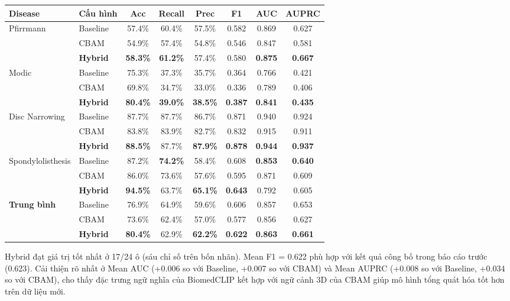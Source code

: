 \documentclass[11pt,a4paper]{article}
\newcommand{\best}[1]{\textcolor{best}{\textbf{#1}}}
\begin{document}
\noindent\small
\begin{tabular}{@{}llcccccc@{}}
\toprule
\rowcolor{tablehdr}
\textbf{Disease} & \textbf{Cấu hình} & Acc & Recall & Prec & F1 & AUC & AUPRC \\
\midrule
\multirow{3}{*}{Pfirrmann}
& Baseline & 57.4\% & 60.4\% & 57.5\% & 0.582 & 0.869 & 0.627 \\
& CBAM & 54.9\% & 57.4\% & 54.8\% & 0.546 & 0.847 & 0.581 \\
& \best{Hybrid} & \best{58.3\%} & \best{61.2\%} & 57.4\% & 0.580 & \best{0.875} & \best{0.667} \\
\midrule
\multirow{3}{*}{Modic}
& Baseline & 75.3\% & 37.3\% & 35.7\% & 0.364 & 0.766 & 0.421 \\
& CBAM & 69.8\% & 34.7\% & 33.0\% & 0.336 & 0.789 & 0.406 \\
& \best{Hybrid} & \best{80.4\%} & \best{39.0\%} & \best{38.5\%} & \best{0.387} & \best{0.841} & \best{0.435} \\
\midrule
\multirow{3}{*}{Disc Narrowing}
& Baseline & 87.7\% & 87.7\% & 86.7\% & 0.871 & 0.940 & 0.924 \\
& CBAM & 83.8\% & 83.9\% & 82.7\% & 0.832 & 0.915 & 0.911 \\
& \best{Hybrid} & \best{88.5\%} & 87.7\% & \best{87.9\%} & \best{0.878} & \best{0.944} & \best{0.937} \\
\midrule
\multirow{3}{*}{Spondylolisthesis}
& Baseline & 87.2\% & \best{74.2\%} & 58.4\% & 0.608 & \best{0.853} & \best{0.640} \\
& CBAM & 86.0\% & 73.6\% & 57.6\% & 0.595 & 0.871 & 0.609 \\
& \best{Hybrid} & \best{94.5\%} & 63.7\% & \best{65.1\%} & \best{0.643} & 0.792 & 0.605 \\
\midrule
\multirow{3}{*}{\textbf{Trung bình}}
& Baseline & 76.9\% & 64.9\% & 59.6\% & 0.606 & 0.857 & 0.653 \\
& CBAM & 73.6\% & 62.4\% & 57.0\% & 0.577 & 0.856 & 0.627 \\
& \best{Hybrid} & \best{80.4\%} & 62.9\% & \best{62.2\%} & \best{0.622} & \best{0.863} & \best{0.661} \\
\bottomrule
\end{tabular}
\normalsize

\vspace{0.5em}
\noindent Hybrid đạt giá trị tốt nhất ở 17/24 ô (sáu chỉ số trên bốn nhãn). Mean F1 = 0.622 phù hợp với kết quả công bố trong báo cáo trước (0.623). Cải thiện rõ nhất ở Mean AUC (+0.006 so với Baseline, +0.007 so với CBAM) và Mean AUPRC (+0.008 so với Baseline, +0.034 so với CBAM), cho thấy đặc trưng ngữ nghĩa của BiomedCLIP kết hợp với ngữ cảnh 3D của CBAM giúp mô hình tổng quát hóa tốt hơn trên dữ liệu mới.
\end{document}
